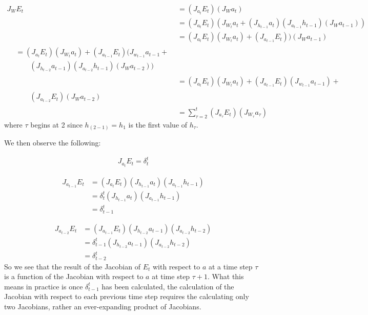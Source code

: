 \begin{align*}
  J_{W} E_t & = (J_{a_t} E_t)(J_{W} a_t) \\
  & = (J_{a_t} E_t)(J_{W_t} a_t + (J_{h_{t-1}} a_t)(J_{a_{t-1}} h_{t-1})(J_{W}a_{t-1})) \\
  & = (J_{a_t} E_t)(J_{W_t} a_t) + (J_{a_{t-1}} E_t))(J_{W}a_{t-1}) \\
  \begin{split}
    & = (J_{a_t} E_t)(J_{W_t} a_t) + (J_{a_{t-1}} E_t)(J_{w_{t-1}} a_{t-1} + \\
    & \qquad (J_{h_{t-2}} a_{t-1})(J_{a_{t-2}} h_{t-1})(J_{W}a_{t-2}))
  \end{split} \\
  & = (J_{a_t} E_t)(J_{W_t} a_t) + (J_{a_{t-1}} E_t)(J_{w_{t-1}} a_{t-1}) + \\
  \begin{split}
    & \qquad (J_{a_{t-2}} E_t)(J_W a_{t-2})
  \end{split} \\
  & = \sum_{\tau=2}^{t}  (J_{a_\tau} E_t)(J_{W_\tau} a_\tau)
\end{align*}
%
where $\tau$ begins at 2 since $h_{(2-1)} = h_1$ is the first value of $h_\tau$.

We then observe the following:

\begin{align*}
  J_{a_t} E_t = \delta_{t}^t
\end{align*}

\begin{align*}
  J_{a_{t-1}} E_t & = (J_{a_t} E_t)(J_{h_{t-1}} a_t)(J_{a_{t-1}} h_{t-1}) \\
  & = \delta_{t}^t (J_{h_{t-1}} a_{t})(J_{a_{t-1}} h_{t-1}) \\
  & = \delta_{t-1}^t
\end{align*}

\begin{align*}
  J_{a_{t-2}} E_t & = (J_{a_{t-1}} E_t)(J_{h_{t-2}} a_{t-1})(J_{a_{t-2}} h_{t-2}) \\
  & = \delta_{t-1}^t (J_{h_{t-2}} a_{t-1})(J_{a_{t-2}} h_{t-2}) \\
  & = \delta_{t-2}^t
\end{align*}
%
So we see that the result of the Jacobian of $E_t$ with respect to $a$ at a time step $\tau$ is a function of the Jacobian with respect to $a$ at time step $\tau + 1$. What this means in practice is once $\delta_{t-1}^t$ has been calculated, the calculation of the Jacobian with respect to each previous time step requires the calculating only two Jacobians, rather an ever-expanding product of Jacobians.

